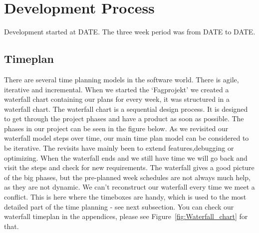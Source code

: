 \chapter{Development Process}
Development started at DATE. The three week period was from DATE to DATE.

\section{Timeplan}%
There are several time planning models in the software world. There is agile, iterative and incremental.
\newline
When we started the `Fagprojekt' we created a waterfall chart containing our plans for every week, it was structured in a waterfall chart. The waterfall chart is a sequential design process. It is designed to get through the project phases and have a product as soon as possible. The phases in our project can be seen in the figure below.
\newline
As we revisited our waterfall model steps over time, our main time plan model can be considered to be iterative. The revisits have mainly been to extend features,debugging or optimizing.
\newline
When the waterfall ends and we still have time we will go back and visit the steps and check for new requirements.
\newline
The waterfall gives a good picture of the big phases, but the pre-planned week schedules are not always much help, as they are not dynamic. We can't reconstruct our waterfall every time we meet a conflict. This is here where the timeboxes are handy, which is used to the most detailed part of the time planning - see next subsection. You can check our waterfall timeplan in the appendices, please see Figure~\ref{fig:Waterfall_chart} for that.
